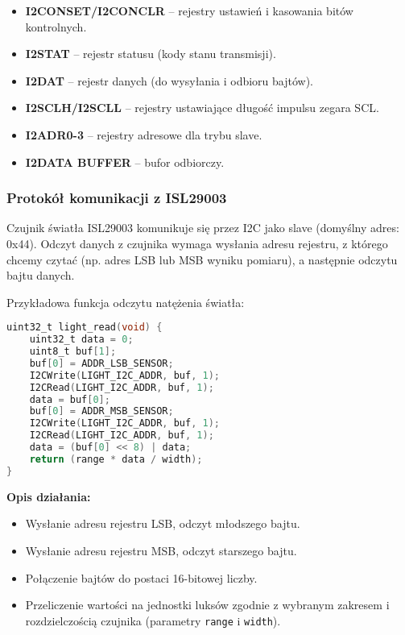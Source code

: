 \documentclass[a4paper,12pt]{report}
\begin{document}
\begin{itemize}
    \item \textbf{I2CONSET/I2CONCLR} – rejestry ustawień i kasowania bitów kontrolnych.
    \item \textbf{I2STAT} – rejestr statusu (kody stanu transmisji).
    \item \textbf{I2DAT} – rejestr danych (do wysyłania i odbioru bajtów).
    \item \textbf{I2SCLH/I2SCLL} – rejestry ustawiające długość impulsu zegara SCL.
    \item \textbf{I2ADR0-3} – rejestry adresowe dla trybu slave.
    \item \textbf{I2DATA BUFFER} – bufor odbiorczy.
\end{itemize}

\subsubsection*{Protokół komunikacji z ISL29003}

Czujnik światła ISL29003 komunikuje się przez I2C jako slave (domyślny adres: 0x44). Odczyt danych z czujnika wymaga wysłania adresu rejestru, z którego chcemy czytać (np. adres LSB lub MSB wyniku pomiaru), a następnie odczytu bajtu danych.

Przykładowa funkcja odczytu natężenia światła:
\begin{lstlisting}[language=C]
uint32_t light_read(void) {
    uint32_t data = 0;
    uint8_t buf[1];
    buf[0] = ADDR_LSB_SENSOR;
    I2CWrite(LIGHT_I2C_ADDR, buf, 1);
    I2CRead(LIGHT_I2C_ADDR, buf, 1);
    data = buf[0];
    buf[0] = ADDR_MSB_SENSOR;
    I2CWrite(LIGHT_I2C_ADDR, buf, 1);
    I2CRead(LIGHT_I2C_ADDR, buf, 1);
    data = (buf[0] << 8) | data;
    return (range * data / width);
}
\end{lstlisting}

\textbf{Opis działania:}
\begin{itemize}
    \item Wysłanie adresu rejestru LSB, odczyt młodszego bajtu.
    \item Wysłanie adresu rejestru MSB, odczyt starszego bajtu.
    \item Połączenie bajtów do postaci 16-bitowej liczby.
    \item Przeliczenie wartości na jednostki luksów zgodnie z wybranym zakresem i rozdzielczością czujnika (parametry \texttt{range} i \texttt{width}).
\end{itemize}
\end{document}
